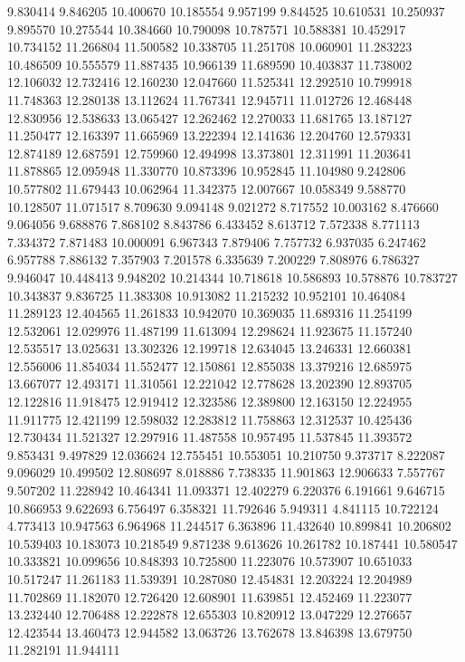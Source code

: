 9.830414
9.846205
10.400670
10.185554
9.957199
9.844525
10.610531
10.250937
9.895570
10.275544
10.384660
10.790098
10.787571
10.588381
10.452917
10.734152
11.266804
11.500582
10.338705
11.251708
10.060901
11.283223
10.486509
10.555579
11.887435
10.966139
11.689590
10.403837
11.738002
12.106032
12.732416
12.160230
12.047660
11.525341
12.292510
10.799918
11.748363
12.280138
13.112624
11.767341
12.945711
11.012726
12.468448
12.830956
12.538633
13.065427
12.262462
12.270033
11.681765
13.187127
11.250477
12.163397
11.665969
13.222394
12.141636
12.204760
12.579331
12.874189
12.687591
12.759960
12.494998
13.373801
12.311991
11.203641
11.878865
12.095948
11.330770
10.873396
10.952845
11.104980
9.242806
10.577802
11.679443
10.062964
11.342375
12.007667
10.058349
9.588770
10.128507
11.071517
8.709630
9.094148
9.021272
8.717552
10.003162
8.476660
9.064056
9.688876
7.868102
8.843786
6.433452
8.613712
7.572338
8.771113
7.334372
7.871483
10.000091
6.967343
7.879406
7.757732
6.937035
6.247462
6.957788
7.886132
7.357903
7.201578
6.335639
7.200229
7.808976
6.786327
9.946047
10.448413
9.948202
10.214344
10.718618
10.586893
10.578876
10.783727
10.343837
9.836725
11.383308
10.913082
11.215232
10.952101
10.464084
11.289123
12.404565
11.261833
10.942070
10.369035
11.689316
11.254199
12.532061
12.029976
11.487199
11.613094
12.298624
11.923675
11.157240
12.535517
13.025631
13.302326
12.199718
12.634045
13.246331
12.660381
12.556006
11.854034
11.552477
12.150861
12.855038
13.379216
12.685975
13.667077
12.493171
11.310561
12.221042
12.778628
13.202390
12.893705
12.122816
11.918475
12.919412
12.323586
12.389800
12.163150
12.224955
11.911775
12.421199
12.598032
12.283812
11.758863
12.312537
10.425436
12.730434
11.521327
12.297916
11.487558
10.957495
11.537845
11.393572
9.853431
9.497829
12.036624
12.755451
10.553051
10.210750
9.373717
8.222087
9.096029
10.499502
12.808697
8.018886
7.738335
11.901863
12.906633
7.557767
9.507202
11.228942
10.464341
11.093371
12.402279
6.220376
6.191661
9.646715
10.866953
9.622693
6.756497
6.358321
11.792646
5.949311
4.841115
10.722124
4.773413
10.947563
6.964968
11.244517
6.363896
11.432640
10.899841
10.206802
10.539403
10.183073
10.218549
9.871238
9.613626
10.261782
10.187441
10.580547
10.333821
10.099656
10.848393
10.725800
11.223076
10.573907
10.651033
10.517247
11.261183
11.539391
10.287080
12.454831
12.203224
12.204989
11.702869
11.182070
12.726420
12.608901
11.639851
12.452469
11.223077
13.232440
12.706488
12.222878
12.655303
10.820912
13.047229
12.276657
12.423544
13.460473
12.944582
13.063726
13.762678
13.846398
13.679750
11.282191
11.944111

